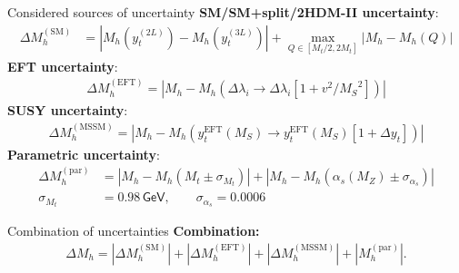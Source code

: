 \documentclass[hyperref={pdfpagelabels=false},ngerman]{beamer}
\newcommand{\eh}[1]{\,\mathsf{#1}}
\newcommand{\MS}{\ensuremath{M_S}}
\renewcommand{\emph}{\textbf}
\newcommand{\SM}{\ensuremath{\text{SM}}}
\newcommand{\MSSM}{\ensuremath{\text{MSSM}}}
\newcommand{\EFT}{\ensuremath{\text{EFT}}\xspace}
\begin{document}
\begin{frame}{Considered sources of uncertainty}
\emph{SM/SM+split/2HDM-II uncertainty}:
  \begin{align*}
    \Delta M_h^{(\SM)} &=
    \left| M_h(y_t^{(2L)}) - M_h(y_t^{(3L)}) \right|
                         + \max_{Q\in[M_t/2, 2M_t]}\left| M_h - M_h(Q) \right|
  \end{align*}
\emph{EFT uncertainty}:
  \begin{align*}
    \Delta M_h^{(\EFT)} = \left| M_h - M_h(\Delta\lambda_i \rightarrow \Delta\lambda_i [1 +
    v^2/\MS^2]) \right|
  \end{align*}
\emph{SUSY uncertainty}:
  \begin{align*}
    \Delta M_h^{(\MSSM)} = \left| M_h - M_h(y_t^{\EFT}(\MS) \rightarrow y_t^{\EFT}(\MS) [1 +
    \Delta y_t]) \right|
  \end{align*}
\emph{Parametric uncertainty}:
  \begin{align*}
    \Delta M_h^{(\text{par})} &= |M_h - M_h(M_t \pm \sigma_{M_t})|
                                + \left|M_h - M_h(\alpha_s(M_Z) \pm \sigma_{\alpha_s})\right|\\
    \sigma_{M_t} &= 0.98\eh{GeV}, \qquad
    \sigma_{\alpha_s} = 0.0006
  \end{align*}
\end{frame}

\begin{frame}{Combination of uncertainties}
  \emph{Combination:}
  \begin{align*}
    \Delta M_h = | \Delta M_h^{(\SM)} | + | \Delta M_h^{(\EFT)} |
    + | \Delta M_h^{(\MSSM)} | + | M_h^{(\text{par})} | .  
  \end{align*}
\end{frame}

\begin{frame}{Individual uncertainties in scenario IV (2HDM-II)}
  \texttt{[image: \{\{plots/THDM/THDMIIMSSMBCFull\_uncertainty\_MS\_MA-800\_uncertainty\_advanced]}}}
\end{frame}
\end{document}
